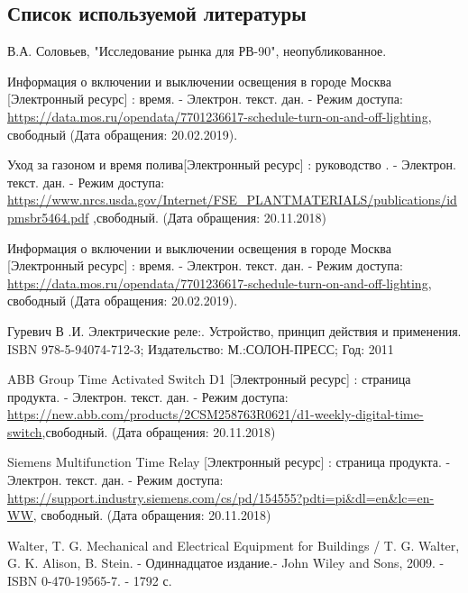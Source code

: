 \subsection{ Список используемой литературы}
\begin{my_enumerate}

\item В.А. Соловьев, "Исследование рынка для РВ-90", неопубликованное.


\item Информация о включении и выключении освещения в городе Москва [Электронный ресурс] : время. - Электрон. текст. дан. - Режим доступа: \url{https://data.mos.ru/opendata/7701236617-schedule-turn-on-and-off-lighting}, свободный (Дата обращения: 20.02.2019). 

\item Уход за газоном и время полива[Электронный ресурс] : руководство . - Электрон. текст. дан. - Режим доступа: \url{https://www.nrcs.usda.gov/Internet/FSE_PLANTMATERIALS/publications/idpmsbr5464.pdf} ,свободный. (Дата обращения: 20.11.2018)

\item Информация о включении и выключении освещения в городе Москва [Электронный ресурс] : время. - Электрон. текст. дан. - Режим доступа: \url{https://data.mos.ru/opendata/7701236617-schedule-turn-on-and-off-lighting}, свободный (Дата обращения: 20.02.2019). 

\item Гуревич В .И. Электрические реле:. Устройство, принцип действия и применения. ISBN 978-5-94074-712-3; Издательство: М.:СОЛОН-ПРЕСС; Год: 2011

\item ABB Group Time Activated Switch D1 [Электронный ресурс] : страница продукта. - Электрон. текст. дан. - Режим доступа: \url{https://new.abb.com/products/2CSM258763R0621/d1-weekly-digital-time-switch},свободный. (Дата обращения: 20.11.2018)

\item Siemens Multifunction Time Relay  [Электронный ресурс] : страница продукта. - Электрон. текст. дан. - Режим доступа:  \url{https://support.industry.siemens.com/cs/pd/154555?pdti=pi&dl=en&lc=en-WW}, свободный. (Дата обращения: 20.11.2018)

\item Walter, T. G. Mechanical and Electrical Equipment for Buildings / T. G. Walter, G. K. Alison, B. Stein. - Одиннадцатое издание.-  John Wiley and Sons, 2009. - ISBN 0-470-19565-7. - 1792 с.


\end{my_enumerate}
